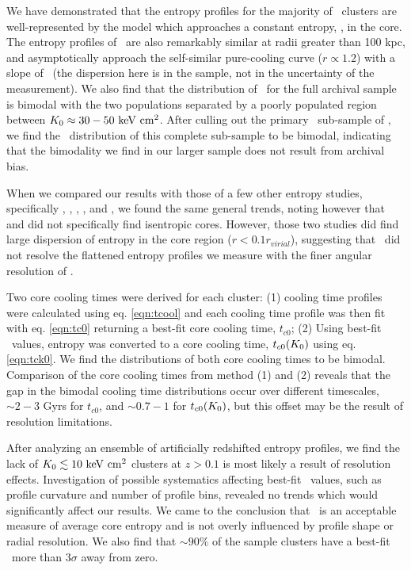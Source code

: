 \documentclass[12pt,preprint]{aastex}
\begin{document}
We have demonstrated that the entropy profiles for the majority of
\accept\ clusters are well-represented by the model which approaches a
constant entropy, \kna, in the core. The entropy profiles of
\accept\ are also remarkably similar at radii greater than 100 kpc,
and asymptotically approach the self-similar pure-cooling curve ($r
\propto 1.2$) with a slope of \alphafs\ (the dispersion here is in the
sample, not in the uncertainty of the measurement). We also find that
the distribution of \kna\ for the full archival sample is bimodal with
the two populations separated by a poorly populated region between
$K_0 \approx 30-50 \mathrm{\mbox{\ensuremath{\mathrm{~keV}}} \mathrm{\mbox{\ensuremath{\mathrm{~cm}}}^2}}$. After culling out the primary
\hifl\ sub-sample of \citet{hiflugcs1}, we find the \kna\ distribution
of this complete sub-sample to be bimodal, indicating that the
bimodality we find in our larger sample does not result from archival
bias.

When we compared our results with those of a few other entropy
studies, specifically \citet{davies00}, \citet{ponman03},
\citet{piffaretti05}, \citet{pratt06}, and \citet{morandi07}, we found
the same general trends, noting however that \citet{piffaretti05} and
\citet{pratt06} did not specifically find isentropic cores. However,
those two studies did find large dispersion of entropy in the core
region ($r < 0.1 r_{virial}$), suggesting that \xmm\ did not resolve
the flattened entropy profiles we measure with the finer angular
resolution of \chandra.

Two core cooling times were derived for each cluster: (1) cooling time
profiles were calculated using eq. \ref{eqn:tcool} and each cooling
time profile was then fit with eq. \ref{eqn:tc0} returning a best-fit
core cooling time, $t_{c0}$; (2) Using best-fit \kna\ values, entropy
was converted to a core cooling time, $t_{c0}(K_0)$ using
eq. \ref{eqn:tck0}. We find the distributions of both core cooling
times to be bimodal. Comparison of the core cooling times from method
(1) and (2) reveals that the gap in the bimodal cooling time
distributions occur over different timescales, $\sim 2-3$ Gyrs for
$t_{c0}$, and $\sim 0.7-1$ for $t_{c0}(K_0)$, but this offset may be
the result of resolution limitations.

After analyzing an ensemble of artificially redshifted entropy
profiles, we find the lack of $K_0 \lesssim 10 \mathrm{\mbox{\ensuremath{\mathrm{~keV}}} \mathrm{\mbox{\ensuremath{\mathrm{~cm}}}^2}}$ clusters at $z > 0.1$
is most likely a result of resolution effects. Investigation of
possible systematics affecting best-fit \kna\ values, such as profile
curvature and number of profile bins, revealed no trends which would
significantly affect our results. We came to the conclusion that
\kna\ is an acceptable measure of average core entropy and is not
overly influenced by profile shape or radial resolution. We also find
that $\sim90\%$ of the sample clusters have a best-fit \kna\ more than
$3\sigma$ away from zero.
\end{document}
